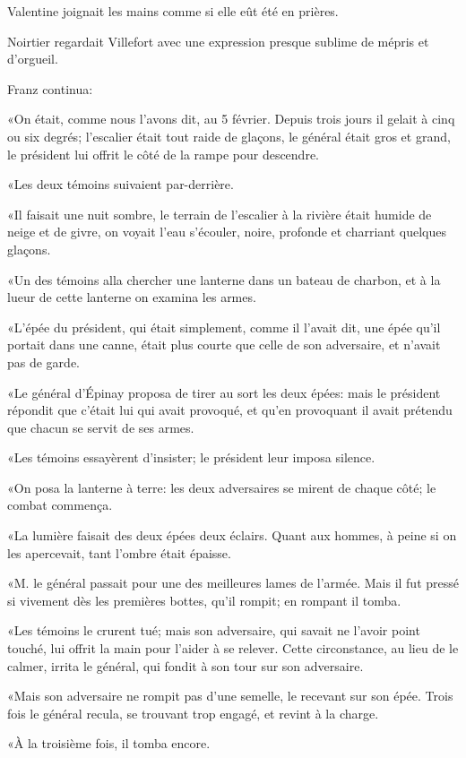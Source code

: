 Valentine joignait les mains comme si elle eût été en prières. 

Noirtier regardait Villefort avec une expression presque sublime de mépris et d'orgueil. 

Franz continua: 

«On était, comme nous l'avons dit, au 5 février. Depuis trois jours il gelait à cinq ou six degrés; l'escalier était tout raide de glaçons, le général était gros et grand, le président lui offrit le côté de la rampe pour descendre. 

«Les deux témoins suivaient par-derrière. 

«Il faisait une nuit sombre, le terrain de l'escalier à la rivière était humide de neige et de givre, on voyait l'eau s'écouler, noire, profonde et charriant quelques glaçons. 

«Un des témoins alla chercher une lanterne dans un bateau de charbon, et à la lueur de cette lanterne on examina les armes.  

«L'épée du président, qui était simplement, comme il l'avait dit, une épée qu'il portait dans une canne, était plus courte que celle de son adversaire, et n'avait pas de garde. 

«Le général d'Épinay proposa de tirer au sort les deux épées: mais le président répondit que c'était lui qui avait provoqué, et qu'en provoquant il avait prétendu que chacun se servit de ses armes. 

«Les témoins essayèrent d'insister; le président leur imposa silence. 

«On posa la lanterne à terre: les deux adversaires se mirent de chaque côté; le combat commença. 

«La lumière faisait des deux épées deux éclairs. Quant aux hommes, à peine si on les apercevait, tant l'ombre était épaisse. 

«M. le général passait pour une des meilleures lames de l'armée. Mais il fut pressé si vivement dès les premières bottes, qu'il rompit; en rompant il tomba. 

«Les témoins le crurent tué; mais son adversaire, qui savait ne l'avoir point touché, lui offrit la main pour l'aider à se relever. Cette circonstance, au lieu de le calmer, irrita le général, qui fondit à son tour sur son adversaire. 

«Mais son adversaire ne rompit pas d'une semelle, le recevant sur son épée. Trois fois le général recula, se trouvant trop engagé, et revint à la charge. 

«À la troisième fois, il tomba encore.  

